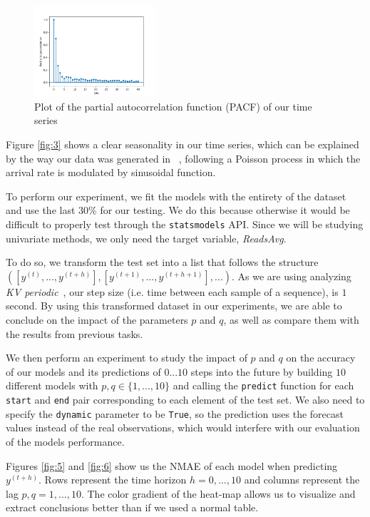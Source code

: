 \documentclass[10pt]{article}
\begin{document}
\begin{figure}[!ht]
    \centering
    \includegraphics[width=0.40\textwidth,height=\textheight,keepaspectratio]{../pacf.png}
    \caption{Plot of the partial autocorrelation function (PACF) of our time series}
    \label{fig:4}
\end{figure}

Figure \ref{fig:3} shows a clear seasonality in our time series, which can be explained by the way our data was generated in ~\cite{9012741}, following a Poisson process in which the arrival rate is modulated by sinusoidal function.

To perform our experiment, we fit the models with the entirety of the dataset and use the last $30\%$ for our testing. We do this because otherwise it would be difficult to properly test through the \texttt{statsmodels} API. Since we will be studying univariate methods, we only need the target variable, \textit{ReadsAvg}.

To do so, we transform the test set into a list that follows the structure $([y^{(t)},...,y^{(t+h)}],[y^{(t+1)},...,y^{(t+h+1)}],...)$. As we are using analyzing \textit{KV periodic}~\cite{9012741}, our step size (i.e. time between each sample of a sequence), is $1$ second. By using this transformed dataset in our experiments, we are able to conclude on the impact of the parameters $p$ and $q$, as well as compare them with the results from previous tasks.

We then perform an experiment to study the impact of $p$ and $q$ on the accuracy of our models and its predictions of $0...10$ steps into the future by building $10$ different models with $p,q\in\{1,...,10\}$ and calling the \texttt{predict} function for each \texttt{start} and \texttt{end} pair corresponding to each element of the test set. We also need to specify the \texttt{dynamic} parameter to be \texttt{True}, so the prediction uses the forecast values instead of the real observations, which would interfere with our evaluation of the models performance.

Figures \ref{fig:5} and \ref{fig:6} show us the \textsc{NMAE} of each model when predicting $y^{(t+h)}$. Rows represent the time horizon $h = 0,...,10$ and columns represent the lag $p,q = 1,...,10$. The color gradient of the heat-map allows us to visualize and extract conclusions better than if we used a normal table.
\end{document}
